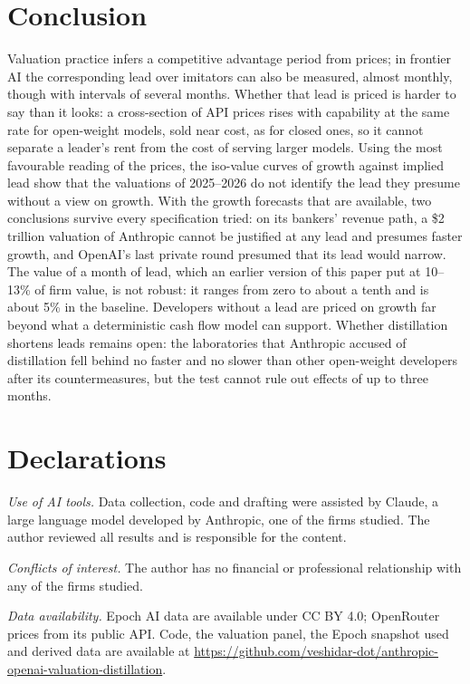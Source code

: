 \documentclass[12pt]{article}
\begin{document}
\section{Conclusion}

Valuation practice infers a competitive advantage period from prices; in frontier AI the corresponding lead over imitators can also be measured, almost monthly, though with intervals of several months. Whether that lead is priced is harder to say than it looks: a cross-section of API prices rises with capability at the same rate for open-weight models, sold near cost, as for closed ones, so it cannot separate a leader's rent from the cost of serving larger models. Using the most favourable reading of the prices, the iso-value curves of growth against implied lead show that the valuations of 2025--2026 do not identify the lead they presume without a view on growth. With the growth forecasts that are available, two conclusions survive every specification tried: on its bankers' revenue path, a \$2 trillion valuation of Anthropic cannot be justified at any lead and presumes faster growth, and OpenAI's last private round presumed that its lead would narrow. The value of a month of lead, which an earlier version of this paper put at 10--13\% of firm value, is not robust: it ranges from zero to about a tenth and is about 5\% in the baseline. Developers without a lead are priced on growth far beyond what a deterministic cash flow model can support. Whether distillation shortens leads remains open: the laboratories that Anthropic accused of distillation fell behind no faster and no slower than other open-weight developers after its countermeasures, but the test cannot rule out effects of up to three months.

\section*{Declarations}
\noindent\textit{Use of AI tools.} Data collection, code and drafting were assisted by Claude, a large language model developed by Anthropic, one of the firms studied. The author reviewed all results and is responsible for the content.

\noindent\textit{Conflicts of interest.} The author has no financial or professional relationship with any of the firms studied.

\noindent\textit{Data availability.} Epoch AI data are available under CC BY 4.0; OpenRouter prices from its public API. Code, the valuation panel, the Epoch snapshot used and derived data are available at \url{https://github.com/veshidar-dot/anthropic-openai-valuation-distillation}.
\end{document}
